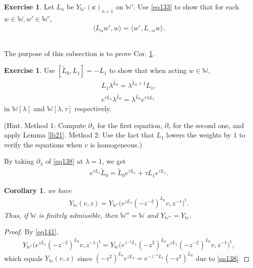 \documentclass[11pt,b5paper,notitlepage]{article}
\theoremstyle{definition}
\newtheorem{exe}[df]{Exercise}
\theoremstyle{plain}
\newtheorem{co}[df]{Corollary}
\newcommand{\wtd}{\widetilde}
\newcommand{\tr}{\mathrm{t}} %
\newcommand{\bk}[1]{\langle {#1}\rangle}
\newcommand{\Wbb}{\mathbb W}
\newcommand{\cbf}{\mathbf c}
\numberwithin{equation}{section}
\begin{document}
\begin{exe}
Let $L_n$ be $Y_{\Wbb'}(\cbf)_{n+1}$ on $\Wbb'$. Use \eqref{eq133} to show that for each $w\in\Wbb,w'\in\Wbb'$,
\begin{align}
\bk{L_nw',w}=\bk{w',L_{-n}w}.	
\end{align}
\end{exe}




\subsection{}

The purpose of this subsection is to prove Cor. \ref{lb91}.

\begin{exe}\label{lb99}
	Use $[\wtd L_0,L_1]=-L_1$ to show that when acting $w\in\Wbb$,
	\begin{subequations}
		\begin{gather}
			L_1	\lambda^{\wtd L_0}=\lambda^{\wtd L_0+1}L_1,\label{eq137}\\
			e^{\tau L_1}\lambda^{\wtd L_0}=\lambda^{\wtd L_0}e^{\tau\lambda L_1}	\label{eq138}
		\end{gather}
	\end{subequations}
	in $\Wbb[\lambda]$ and $\Wbb[\lambda,\tau]$ respectively.
	
	(Hint. Method 1: Compute $\partial_\lambda$ for the first equation,  $\partial_{\tau}$ for the second one, and apply Lemma \ref{lb21}. Method 2: Use the fact that $L_1$ lowers the weights by $1$ to verify the equations when $v$ is homogeneous.)
\end{exe}
By taking $\partial_\lambda$ of \eqref{eq138} at $\lambda=1$, we get
\begin{align}
	e^{\tau L_1}\wtd L_0=\wtd L_0e^{\tau L_1}+\tau L_1e^{\tau L_1}.\label{eq139}	
\end{align}

\begin{co}\label{lb91}
	we have
	\begin{align}
		Y_\Wbb(v,z)=Y_{\Wbb'}\big(e^{zL_1}(-z^{-2})^{L_0}v,z^{-1}\big)^\tr.	
	\end{align}
	Thus, if $\Wbb$ is finitely admissible, then $\Wbb''=\Wbb$ and $Y_{\Wbb''}=Y_\Wbb$. 
\end{co}

\begin{proof}
	By \eqref{eq141},
	\begin{align*}
		Y_{\Wbb'}\big(e^{zL_1}(-z^{-2})^{L_0}v,z^{-1}\big)^\tr=Y_\Wbb\big(e^{z^{-1}L_1}(-z^2)^{L_0}e^{zL_1}(-z^{-2})^{L_0}v,z^{-1} \big)^\tr,	
	\end{align*}
	which equals $Y_\Wbb(v,z)$ since $(-z^2)^{L_0}e^{zL_1}=e^{-z^{-1}L_1}(-z^2)^{L_0}$ due to \eqref{eq138}.
\end{proof}
\end{document}
